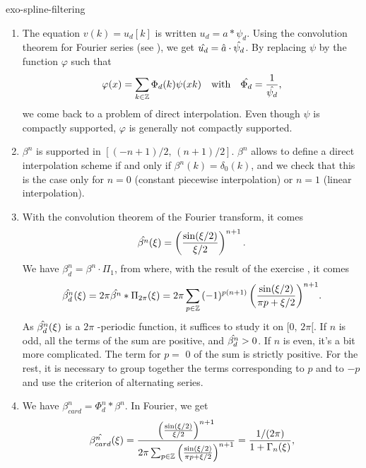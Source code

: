  
\begin{correction}{exo-spline-filtering}
\begin{enumerate}
\item {} The equation $ v (k) = u_d [k] $ is written $ u_d = a * \psi_d $. Using the convolution theorem for Fourier series (see \cite{zq}), we get $ \hat{u_d} = \hat{a} \cdot \hat{\psi_d} $. By replacing $ \psi $ by the function $ \varphi $ such that
\begin{equation*}
	\varphi(x) = \sum_{k \in \mathbb{Z}}{\Phi_d (k) \psi (xk)} \quad \text{with} \quad \hat{\Phi_d} = \frac{1}{\hat{\psi_d}},
\end{equation*}
we come back to a problem of direct interpolation. Even though $ \psi $ is compactly supported, $ \varphi $ is generally not compactly supported.
\item $ \beta^n $ is supported in $ [(- n+1)/2, \, (n+1)/2] $. $ \beta^n $ allows to define a direct interpolation scheme if and only if $ \beta^n (k) = \delta_0 (k) $, and we check that this is the case only for $ n = 0 $ (constant piecewise interpolation) or $ n = 1 $ (linear interpolation).
\item With the convolution theorem of the Fourier transform, it comes
\begin{equation*}
	\hat{\beta^n} (\xi) = \left(\frac{\sin(\xi/2)}{\xi/2} \right)^{n+1}.
\end{equation*}
We have $ \beta_d^n = \beta^n \cdot \Pi_1 $, from where, with the result of the exercise , it comes
\begin{equation*}
\hat{\beta_d^n} (\xi) = 2 \pi \hat{\beta^n} * \Pi_{2 \pi} (\xi) = 2 \pi \sum_{p \in \mathbb{Z}}{(-1)^{p (n+1)} \left(\frac{\sin(\xi/2)}{\pi p + \xi/2} \right)^{n+1}}.
\end{equation*}
As $ \hat{\beta_d^n} (\xi) $ is a $ 2 \pi $ -periodic function, it suffices to study it on $ [0, \, 2 \pi [$. If $ n $ is odd, all the terms of the sum are positive, and $ \hat{\beta_d^n}> 0 $. If $ n $ is even, it's a bit more complicated. The term for $ p = $ 0 of the sum is strictly positive. For the rest, it is necessary to group together the terms corresponding to $ p $ and to $ -p $ and use the criterion of alternating series.
\item {} We have $ \beta^n_{card} = \Phi_d^n * \beta^n $. In Fourier, we get
\begin{equation*}
\wh{\beta^n_{card}} (\xi) = \frac{\left(\frac{\sin(\xi/2)}{\xi/2} \right)^{n+1}}{2 \pi \sum_{p \in \ZZ}{\left(\frac{\sin(\xi/2)}{\pi p + \xi/2} \right)^{n+1}}} = \frac{1/(2 \pi)}{1+ \Gamma_n (\xi)},

\end{equation*}
\end{enumerate}
\end{correction}
